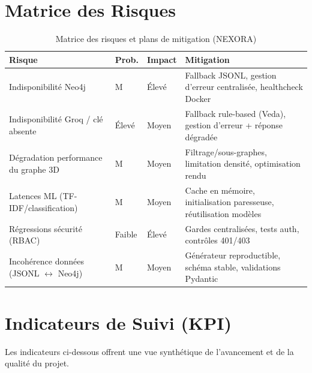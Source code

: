 \documentclass[12pt,a4paper]{report}
\begin{document}
\section{Matrice des Risques}
\begin{table}[H]
\centering
\caption{Matrice des risques et plans de mitigation (NEXORA)}
\label{tab:risk_matrix}
\begin{tabular}{p{5.5cm} p{2.2cm} p{2.2cm} p{5cm}}
\toprule
\textbf{Risque} & \textbf{Prob.} & \textbf{Impact} & \textbf{Mitigation} \\
\midrule
Indisponibilité Neo4j & M & Élevé & Fallback JSONL, gestion d'erreur centralisée, healthcheck Docker \\
Indisponibilité Groq / clé absente & Élevé & Moyen & Fallback rule-based (Veda), gestion d'erreur + réponse dégradée \\
Dégradation performance du graphe 3D & M & Moyen & Filtrage/sous-graphes, limitation densité, optimisation rendu \\
Latences ML (TF-IDF/classification) & M & Moyen & Cache en mémoire, initialisation paresseuse, réutilisation modèles \\
Régressions sécurité (RBAC) & Faible & Élevé & Gardes centralisées, tests auth, contrôles 401/403 \\
Incohérence données (JSONL $\leftrightarrow$ Neo4j) & M & Moyen & Générateur reproductible, schéma stable, validations Pydantic \\
\bottomrule
\end{tabular}
\end{table}

\section{Indicateurs de Suivi (KPI)}
Les indicateurs ci-dessous offrent une vue synthétique de l'avancement et de la qualité du projet.
\end{document}
